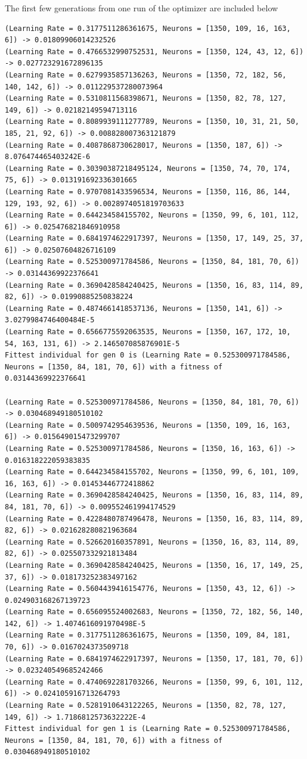 \documentclass{report}
\begin{document}
The first few generations from one run of the optimizer are included below
\tiny
\begin{verbatim}
(Learning Rate = 0.3177511286361675, Neurons = [1350, 109, 16, 163, 6]) -> 0.01809906014232526
(Learning Rate = 0.4766532990752531, Neurons = [1350, 124, 43, 12, 6]) -> 0.027723291672896135
(Learning Rate = 0.6279935857136263, Neurons = [1350, 72, 182, 56, 140, 142, 6]) -> 0.011229537280073964
(Learning Rate = 0.5310811568398671, Neurons = [1350, 82, 78, 127, 149, 6]) -> 0.02182149594713116
(Learning Rate = 0.8089939111277789, Neurons = [1350, 10, 31, 21, 50, 185, 21, 92, 6]) -> 0.008828007363121879
(Learning Rate = 0.4087868730628017, Neurons = [1350, 187, 6]) -> 8.076474465403242E-6
(Learning Rate = 0.30390387218495124, Neurons = [1350, 74, 70, 174, 75, 6]) -> 0.013191692336301665
(Learning Rate = 0.9707081433596534, Neurons = [1350, 116, 86, 144, 129, 193, 92, 6]) -> 0.0028974051819703633
(Learning Rate = 0.644234584155702, Neurons = [1350, 99, 6, 101, 112, 6]) -> 0.025476821846910958
(Learning Rate = 0.6841974622917397, Neurons = [1350, 17, 149, 25, 37, 6]) -> 0.02507604826716109
(Learning Rate = 0.525300971784586, Neurons = [1350, 84, 181, 70, 6]) -> 0.03144369922376641
(Learning Rate = 0.3690428584240425, Neurons = [1350, 16, 83, 114, 89, 82, 6]) -> 0.01990885250838224
(Learning Rate = 0.4874661418537136, Neurons = [1350, 141, 6]) -> 3.0279984746400484E-5
(Learning Rate = 0.6566775592063535, Neurons = [1350, 167, 172, 10, 54, 163, 131, 6]) -> 2.146507085876901E-5
Fittest individual for gen 0 is (Learning Rate = 0.525300971784586, Neurons = [1350, 84, 181, 70, 6]) with a fitness of 0.03144369922376641

(Learning Rate = 0.525300971784586, Neurons = [1350, 84, 181, 70, 6]) -> 0.030468949180510102
(Learning Rate = 0.5009742954639536, Neurons = [1350, 109, 16, 163, 6]) -> 0.015649015473299707
(Learning Rate = 0.525300971784586, Neurons = [1350, 16, 163, 6]) -> 0.016318222059383835
(Learning Rate = 0.644234584155702, Neurons = [1350, 99, 6, 101, 109, 16, 163, 6]) -> 0.01453446772418862
(Learning Rate = 0.3690428584240425, Neurons = [1350, 16, 83, 114, 89, 84, 181, 70, 6]) -> 0.009552461994174529
(Learning Rate = 0.4228480787496478, Neurons = [1350, 16, 83, 114, 89, 82, 6]) -> 0.021628280821963684
(Learning Rate = 0.526620160357891, Neurons = [1350, 16, 83, 114, 89, 82, 6]) -> 0.025507332921813484
(Learning Rate = 0.3690428584240425, Neurons = [1350, 16, 17, 149, 25, 37, 6]) -> 0.018173252383497162
(Learning Rate = 0.5604439416154776, Neurons = [1350, 43, 12, 6]) -> 0.024903168267139723
(Learning Rate = 0.656095524002683, Neurons = [1350, 72, 182, 56, 140, 142, 6]) -> 1.4074616091970498E-5
(Learning Rate = 0.3177511286361675, Neurons = [1350, 109, 84, 181, 70, 6]) -> 0.0167024373509718
(Learning Rate = 0.6841974622917397, Neurons = [1350, 17, 181, 70, 6]) -> 0.023240549685242466
(Learning Rate = 0.4740692281703266, Neurons = [1350, 99, 6, 101, 112, 6]) -> 0.024105916713264793
(Learning Rate = 0.5281910643122265, Neurons = [1350, 82, 78, 127, 149, 6]) -> 1.7186812573632222E-4
Fittest individual for gen 1 is (Learning Rate = 0.525300971784586, Neurons = [1350, 84, 181, 70, 6]) with a fitness of 0.030468949180510102


\end{verbatim}
\end{document}
